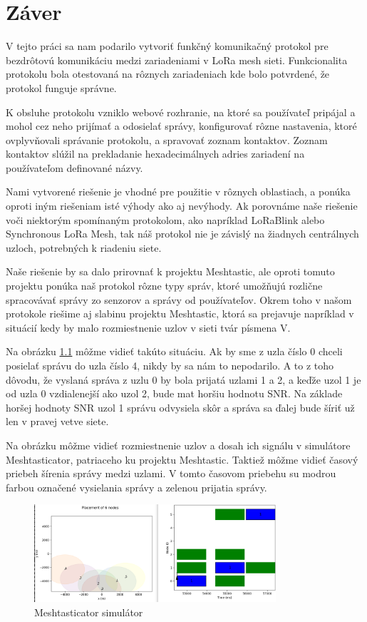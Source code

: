 \documentclass[slovak,master]{diploma}
\begin{document}
\chapter{Záver}
V tejto práci sa nam podarilo vytvoriť funkčný komunikačný protokol pre bezdrôtovú komunikáciu medzi zariadeniami v LoRa mesh sieti.
Funkcionalita protokolu bola otestovaná na rôznych zariadeniach kde bolo potvrdené, že protokol funguje správne. 

K obsluhe protokolu vzniklo webové rozhranie, na ktoré sa používateľ pripájal a mohol cez neho prijímať a odosielať správy, konfigurovať 
rôzne nastavenia, ktoré ovplyvňovali správanie protokolu, a spravovať zoznam kontaktov. Zoznam kontaktov slúžil na prekladanie 
hexadecimálnych adries zariadení na používateľom definované názvy.

Nami vytvorené riešenie je vhodné pre použitie v rôznych oblastiach, a ponúka oproti iným riešeniam isté výhody ako aj nevýhody.
Ak porovnáme naše riešenie voči niektorým spomínaným protokolom, ako napríklad LoRaBlink alebo Synchronous LoRa Mesh, 
tak náš protokol nie je závislý na žiadnych centrálnych uzloch, potrebných k riadeniu siete.

Naše riešenie by sa dalo prirovnať k projektu Meshtastic, ale oproti tomuto projektu ponúka naš protokol rôzne typy správ, ktoré umožňujú 
rozlične spracovávať správy zo senzorov a správy od používateľov. Okrem toho v našom protokole riešime aj slabinu projektu Meshtastic, ktorá 
sa prejavuje napríklad v situácií kedy by malo rozmiestnenie uzlov v sieti tvár písmena V.

Na obrázku \ref{fig:mestasticV} môžme vidieť takúto situáciu. Ak by sme z uzla číslo 0 chceli posielať správu do uzla číslo 4, nikdy by sa nám to nepodarilo.
A to z toho dôvodu, že vyslaná správa z uzlu 0 by bola prijatá uzlami 1 a 2, a keďže uzol 1 je od uzla 0 vzdialenejší ako uzol 2, bude mat horšiu hodnotu SNR.
Na základe horšej hodnoty SNR uzol 1 správu odvysiela skôr a správa sa ďalej bude šíriť už len v pravej vetve siete.

Na obrázku môžme vidieť rozmiestnenie uzlov a dosah ich signálu v simulátore Meshtasticator, patriaceho ku projektu Meshtastic. Taktiež môžme vidieť časový priebeh šírenia správy medzi uzlami. 
V tomto časovom priebehu su modrou farbou označené vysielania správy a zelenou prijatia správy.
\newpage
\begin{figure}[h!]
  \centering
  \includegraphics[width=0.8\textwidth]{Figures/meshtasticV.png}
  \caption{Meshtasticator simulátor}
  \label{fig:mestasticV}
\end{figure}
\end{document}
